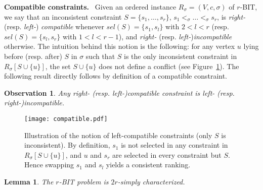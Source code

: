 \documentclass[11pt]{article}
\newtheorem{observation}[theorem]{Observation}
\newtheorem{lemma}[theorem]{Lemma}
\begin{document}
\noindent \textbf{Compatible constraints.}~ 
Given an ordered instance $R_\sigma = (V, c, \sigma)$  of $r$-BIT, we say that an inconsistent constraint $S = \{s_1, \ldots, s_r\}$, $s_1 <_\sigma \ldots <_\sigma s_r$, is \emph{right-} (resp. \emph{left-}) \emph{compatible} whenever $sel(S) = \{s_1, s_l\}$ with $2 < l < r$ (resp. $sel(S) = \{s_l, s_r\}$ with $1 < l < r - 1$), and \emph{right-} (resp. \emph{left-})\emph{incompatible} otherwise. The intuition behind this notion is the following: for any vertex $u$ lying before (resp. after) $S$ in $\sigma$ such that $S$ is the only inconsistent constraint in $R_\sigma[S \cup \{u\}]$, the set $S \cup \{u\}$ does not define a conflict (see Figure~\ref{fig:compatible}). The following result directly follows by definition of a compatible constraint. 

\begin{observation}
\label{obs:comp}
	Any right- (resp. left-)compatible constraint is left- (resp. right-)incompatible. 

\end{observation}

\begin{figure}[t]

	\centerline{\texttt{[image: compatible.pdf]}}
	\caption{Illustration of the notion of left-compatible constraints (only $S$ is inconsistent). By definition, 
	$s_1$ is not selected in any constraint in $R_\sigma[S \cup \{u\}]$, and $u$ and $s_{r}$ are selected in every constraint but $S$. Hence swapping $s_1$ and $s_l$ yields a consistent ranking. \label{fig:compatible}}
\end{figure}

\begin{lemma}
\label{lem:rBITdoubleconflict}
	The {\sc $r$-BIT} problem is $2r$-simply characterized.
\end{lemma}
\end{document}
